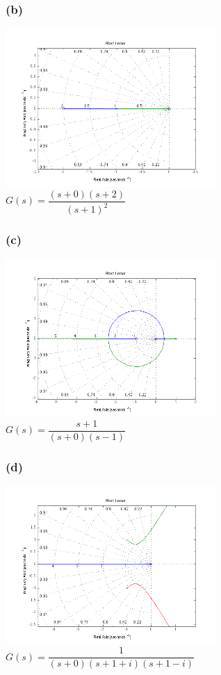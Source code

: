 \documentclass[letterpaper,10pt]{article}
\begin{document}
\subsubsection*{(b)}
\begin{center}
    \includegraphics[width=0.6\textwidth]{homework04-7-1-b.png} \\
   $G(s) = \dfrac{(s+0)(s+2)}{(s+1)^{2}}$
\end{center}
\subsubsection*{(c)}
\begin{center}
    \includegraphics[width=0.6\textwidth]{homework04-7-1-c.png} \\
   $G(s) = \dfrac{s+1}{(s+0)(s-1)}$
\end{center}
\subsubsection*{(d)}
\begin{center}
    \includegraphics[width=0.6\textwidth]{homework04-7-1-d.png} \\
   $G(s) = \dfrac{1}{(s+0)(s+1+i)(s+1-i)}$
\end{center}
\end{document}
